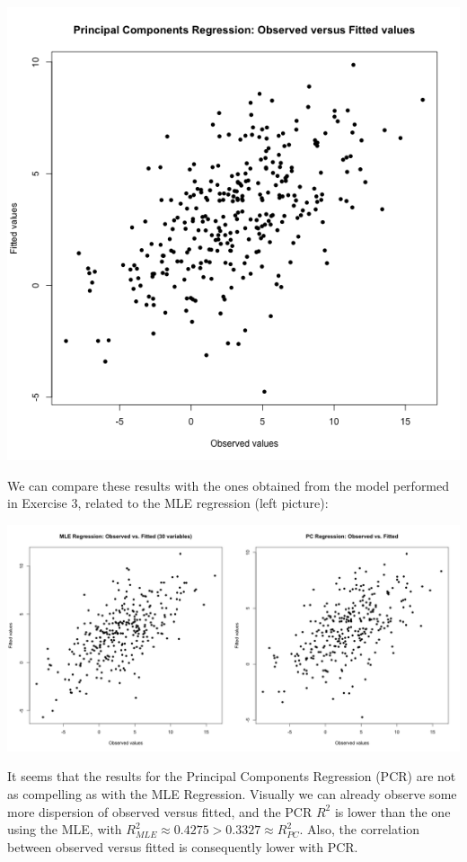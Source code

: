 \documentclass[a4paper, 11pt]{article}
\begin{document}
\begin{center}
\includegraphics[scale=0.5]{ps1_plot6.png}
\end{center}
We can compare these results with the ones obtained from the model performed in Exercise 3, related to the MLE regression (left picture):
\begin{center}
\includegraphics[scale=0.4]{ps1_plot7.png}
\end{center}
It seems that the results for the Principal Components Regression (PCR) are not as compelling as with the MLE Regression. Visually we can already observe some more dispersion of observed versus fitted, and the PCR $R^2$ is lower than the one using the MLE, with $R_{MLE}^2 \approx 0.4275 > 0.3327 \approx R_{PC}^2$. Also, the correlation between observed versus fitted is consequently lower with PCR.
\end{document}
